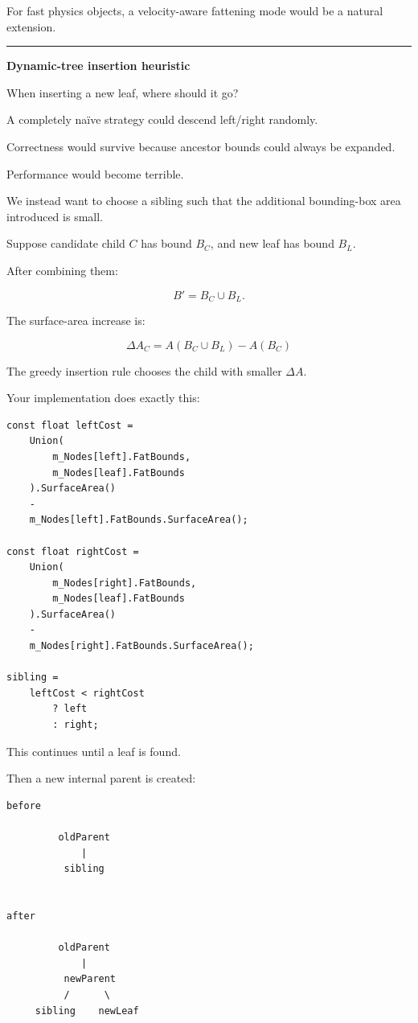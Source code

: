 For fast physics objects, a velocity-aware fattening mode would be a natural extension.

\begin{center}\rule{0.5\linewidth}{0.5pt}\end{center}

\textbf{Dynamic-tree insertion heuristic}

When inserting a new leaf, where should it go?

A completely naïve strategy could descend left/right randomly.

Correctness would survive because ancestor bounds could always be expanded.

Performance would become terrible.

We instead want to choose a sibling such that the additional bounding-box area introduced is small.

Suppose candidate child \(C\) has bound \(B_C\), and new leaf has bound \(B_L\).

After combining them:

\[
B'=
B_C\cup B_L.
\]

The surface-area increase is:

\[
\boxed{
\Delta A_C
=
A(B_C\cup B_L)-A(B_C)
}
\]

The greedy insertion rule chooses the child with smaller \(\Delta A\).

Your implementation does exactly this:

\begin{verbatim}
const float leftCost =
    Union(
        m_Nodes[left].FatBounds,
        m_Nodes[leaf].FatBounds
    ).SurfaceArea()
    -
    m_Nodes[left].FatBounds.SurfaceArea();

const float rightCost =
    Union(
        m_Nodes[right].FatBounds,
        m_Nodes[leaf].FatBounds
    ).SurfaceArea()
    -
    m_Nodes[right].FatBounds.SurfaceArea();

sibling =
    leftCost < rightCost
        ? left
        : right;
\end{verbatim}

This continues until a leaf is found.

Then a new internal parent is created:

\begin{verbatim}
before

         oldParent
             |
          sibling


after

         oldParent
             |
          newParent
          /      \
     sibling    newLeaf
\end{verbatim}

